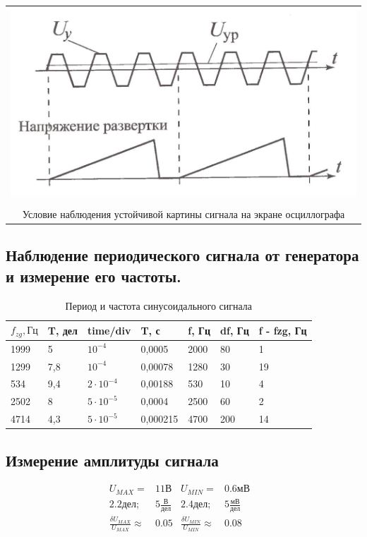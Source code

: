 \documentclass[a4paper,12pt]{article}
\begin{document}
\begin{center}
	\begin{tabular}{c}
		
		\includegraphics[width=0.7\linewidth]{pic2.jpg}\\
		\\	Условие наблюдения устойчивой картины сигнала на экране осциллографа
		
	\end{tabular}
\end{center}

\newpage

	\subsection*{Наблюдение периодического сигнала от генератора и измерение его частоты.}
\begin{table}[h!]
	\begin{center}
	\begin{tabular}{|l|l|l|l|l|l|l|}
		\hline
	$	f_{zg}, Гц $& T, дел & time/div & T, с     & f, Гц           & df, Гц         & f - fzg, Гц \\ \hline
		1999  & 5      &   $10^{-4}$& 0,0005   & 2000            & 80             & 1           \\ \hline
		1299  & 7,8    & $10^{-4}$ & 0,00078  & 1280& 30 & 19         \\ \hline
		534   & 9,4    & $2 \cdot 10^{-4}$& 0,00188  & 530   & 10& 4        \\ \hline
		2502  & 8      &$ 5 \cdot 10^{-5}$ & 0,0004   & 2500            & 60         & 2         \\ \hline
		4714  & 4,3    &$ 5 \cdot 10^{-5}$  & 0,000215 & 4700 & 200 & 14    \\ \hline
	\end{tabular}
\caption{Период и частота синусоидального сигнала}
\end{center}
\end{table}
	
	\subsection*{Измерение амплитуды сигнала}
	\begin{align*}
	U_{MAX} =& 11В&
	U_{MIN} =& 0.6мВ& \\
	2.2дел;\: \: & 5\frac{В}{дел}&
	2.4дел;\: \: & 5\frac{мВ}{дел}& \\
	\frac{\delta U_{MAX}}{U_{MAX}} \approx& 0.05& 
	\frac{\delta U_{MIN}}{U_{MIN}} \approx& 0.08& 
	\end{align*}
	
\end{document}
